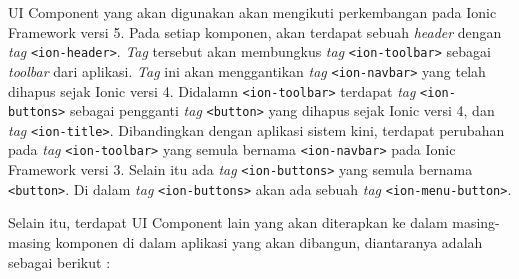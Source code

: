 UI Component yang akan digunakan akan mengikuti perkembangan pada Ionic Framework versi 5. Pada setiap komponen, akan terdapat sebuah \textit{header} dengan \textit{tag} \texttt{<ion-header>}. \textit{Tag} tersebut akan membungkus \textit{tag} \texttt{<ion-toolbar>} sebagai \textit{toolbar} dari aplikasi. \textit{Tag} ini akan menggantikan \textit{tag} \texttt{<ion-navbar>} yang telah dihapus sejak Ionic versi 4. Didalamn \texttt{<ion-toolbar>} terdapat \textit{tag} \texttt{<ion-buttons>} sebagai pengganti \textit{tag} \texttt{<button>} yang dihapus sejak Ionic versi 4, dan \textit{tag} \texttt{<ion-title>}. Dibandingkan dengan aplikasi sistem kini, terdapat perubahan pada \textit{tag} \texttt{<ion-toolbar>} yang semula bernama \texttt{<ion-navbar>} pada Ionic Framework versi 3. Selain itu ada \textit{tag} \texttt{<ion-buttons>} yang semula bernama \texttt{<button>}. Di dalam \textit{tag} \texttt{<ion-buttons>} akan ada sebuah \textit{tag} \texttt{<ion-menu-button>}.

Selain itu, terdapat UI Component lain yang akan diterapkan ke dalam masing-masing komponen di dalam aplikasi yang akan dibangun, diantaranya adalah sebagai berikut :

